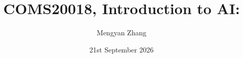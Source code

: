 \usepackage{amsmath, amssymb, graphicx}
\usepackage[]{algorithm2e}
\usepackage{pdfpages}
\usepackage{bm}
\usepackage{relsize}
\usepackage[british]{babel}
\usepackage{tikz,tikzsymbols}
\usepackage{hyperref}
\usepackage{cancel}
\usepackage{caption,subcaption}
\usepackage{adjustbox}
\usepackage{overpic}
\usepackage[UKenglish]{isodate}
\usepackage{tabularx}
\usepackage{array}
\usepackage{booktabs}

\usetikzlibrary{arrows,decorations.markings,positioning,calc}

\newcommand{\bs}{\boldsymbol}


\hypersetup{colorlinks,linkcolor=,urlcolor=blue}
\newenvironment{titledslide}[1]{\begin{frame}\frametitle{#1}}{\end{frame}}



\author{Mengyan Zhang}

\title{COMS20018, Introduction to AI:\\ \vspace{5pt} \lecttitle}

\date{21st September 2026}

